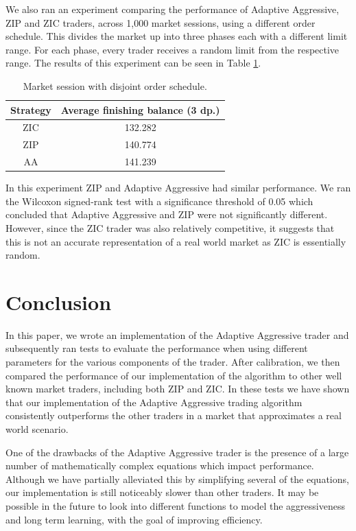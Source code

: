 \documentclass[preprint]{acm_proc_article-sp} %
\begin{document}
We also ran an experiment comparing the performance of Adaptive Aggressive, ZIP
and ZIC traders, across 1,000 market sessions, using a different order schedule.
This divides the
market up into three phases each with a  different limit range. For each phase,
every trader receives a random limit from the respective range. The results of this
experiment can be seen in Table \ref{tbl:disjoint_market}.
\begin{table}[H]
  \centering
  \begin{tabular}{ | c | c | }
    \hline
    Strategy & Average finishing balance (3 dp.) \\
    \hline
    ZIC & 132.282 \\
    ZIP & 140.774 \\
    AA & 141.239 \\
    \hline
  \end{tabular}
  \caption{Market session with disjoint order schedule.}
  \label{tbl:disjoint_market}
\end{table}
In this experiment ZIP and Adaptive Aggressive had similar performance. We ran the
Wilcoxon signed-rank test with a significance threshold of 0.05 which concluded
that Adaptive Aggressive and ZIP were not significantly different. However,
since the ZIC trader was also relatively competitive, it suggests that this is
not an accurate representation of a real world market as ZIC is essentially random.\\


\section{Conclusion} \label{sec:conclusion}
In this paper, we wrote an implementation of the Adaptive Aggressive trader and
subsequently ran tests to evaluate the performance when using different
parameters for the various components of the trader. After calibration, we then
compared the performance of our implementation of the algorithm  to other well
known market traders, including both ZIP and ZIC. In these tests we have shown
that our implementation of the  Adaptive Aggressive trading algorithm
consistently outperforms the other traders in a market that approximates a  real world scenario.

One of the drawbacks of the Adaptive Aggressive trader is the presence of a large number of
mathematically complex equations which impact performance. Although we have partially
alleviated this by simplifying several of the equations, our implementation is still
noticeably slower than other traders. It may be possible in the future to look
into different functions to model the aggressiveness and long term learning,
with the goal of improving efficiency.



\end{document}
